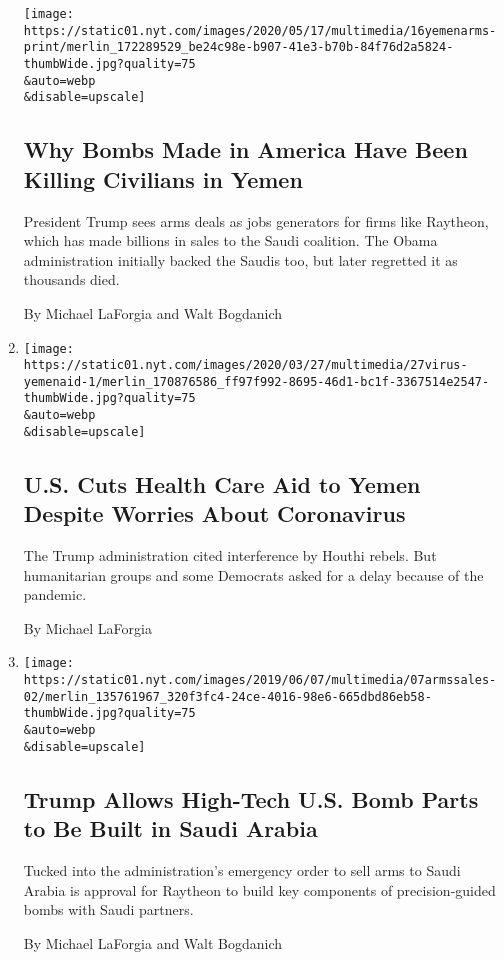 \begin{enumerate}
  \texttt{[image: https://static01.nyt.com/images/2020/05/17/multimedia/16yemenarms-print/merlin\_172289529\_be24c98e-b907-41e3-b70b-84f76d2a5824-thumbWide.jpg?quality=75\\\&auto=webp\\\&disable=upscale]}

  \hypertarget{why-bombs-made-in-america-have-been-killing-civilians-in-yemen}{%
  \subsection{Why Bombs Made in America Have Been Killing Civilians in
  Yemen}\label{why-bombs-made-in-america-have-been-killing-civilians-in-yemen}}

  President Trump sees arms deals as jobs generators for firms like
  Raytheon, which has made billions in sales to the Saudi coalition. The
  Obama administration initially backed the Saudis too, but later
  regretted it as thousands died.

  By Michael LaForgia and Walt Bogdanich
\item
  \href{/2020/03/27/world/middleeast/yemen-health-care-aid-coronavirus.html}{}

  \texttt{[image: https://static01.nyt.com/images/2020/03/27/multimedia/27virus-yemenaid-1/merlin\_170876586\_ff97f992-8695-46d1-bc1f-3367514e2547-thumbWide.jpg?quality=75\\\&auto=webp\\\&disable=upscale]}

  \hypertarget{us-cuts-health-care-aid-to-yemen-despite-worries-about-coronavirus}{%
  \subsection{U.S. Cuts Health Care Aid to Yemen Despite Worries About
  Coronavirus}\label{us-cuts-health-care-aid-to-yemen-despite-worries-about-coronavirus}}

  The Trump administration cited interference by Houthi rebels. But
  humanitarian groups and some Democrats asked for a delay because of
  the pandemic.

  By Michael LaForgia
\item
  \href{/2019/06/07/us/saudi-arabia-arms-sales-raytheon.html}{}

  \texttt{[image: https://static01.nyt.com/images/2019/06/07/multimedia/07armssales-02/merlin\_135761967\_320f3fc4-24ce-4016-98e6-665dbd86eb58-thumbWide.jpg?quality=75\\\&auto=webp\\\&disable=upscale]}

  \hypertarget{trump-allows-high-tech-us-bomb-parts-to-be-built-in-saudi-arabia}{%
  \subsection{Trump Allows High-Tech U.S. Bomb Parts to Be Built in
  Saudi
  Arabia}\label{trump-allows-high-tech-us-bomb-parts-to-be-built-in-saudi-arabia}}

  Tucked into the administration's emergency order to sell arms to Saudi
  Arabia is approval for Raytheon to build key components of
  precision-guided bombs with Saudi partners.

  By Michael LaForgia and Walt Bogdanich
\end{enumerate}

